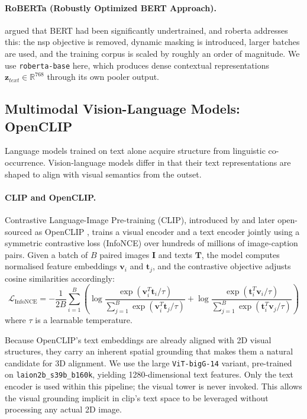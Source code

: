 \paragraph{RoBERTa (Robustly Optimized BERT Approach).}
\textcite{liu2019roberta} argued that BERT had been significantly undertrained, and \gls{roberta} addresses this: the \gls{nsp} objective is removed, dynamic masking is introduced, larger batches are used, and the training corpus is scaled by roughly an order of magnitude. We use \texttt{roberta-base} here, which produces dense contextual representations $\mathbf{z}_{text} \in \mathbb{R}^{768}$ through its own pooler output.

\subsection{Multimodal Vision-Language Models: OpenCLIP}
\label{subsec:clip_encoders}

Language models trained on text alone acquire structure from linguistic co-occurrence. Vision-language models differ in that their text representations are shaped to align with visual semantics from the outset.

\paragraph{CLIP and OpenCLIP.}
Contrastive Language-Image Pre-training (CLIP), introduced by \textcite{radford2021learning} and later open-sourced as OpenCLIP \cite{cherti2023reproducible}, trains a visual encoder and a text encoder jointly using a symmetric contrastive loss (InfoNCE) over hundreds of millions of image-caption pairs. Given a batch of $B$ paired images $\mathbf{I}$ and texts $\mathbf{T}$, the model computes normalised feature embeddings $\mathbf{v}_i$ and $\mathbf{t}_j$, and the contrastive objective adjusts cosine similarities accordingly:
\begin{equation}
\mathcal{L}_{\mathrm{InfoNCE}} = -\frac{1}{2B} \sum_{i=1}^B \left(
    \log \frac{\exp(\mathbf{v}_i^T \mathbf{t}_i / \tau)}
              {\sum_{j=1}^B \exp(\mathbf{v}_i^T \mathbf{t}_j / \tau)}
    + \log \frac{\exp(\mathbf{t}_i^T \mathbf{v}_i / \tau)}
                {\sum_{j=1}^B \exp(\mathbf{t}_i^T \mathbf{v}_j / \tau)}
\right)
\end{equation}
where $\tau$ is a learnable temperature.

Because OpenCLIP's text embeddings are already aligned with 2D visual structures, they carry an inherent spatial grounding that makes them a natural candidate for 3D alignment. We use the large \texttt{ViT-bigG-14} variant, pre-trained on \texttt{laion2b\_s39b\_b160k}, yielding 1280-dimensional text features. Only the text encoder is used within this pipeline; the visual tower is never invoked. This allows the visual grounding implicit in \gls{clip}'s text space to be leveraged without processing any actual 2D image.

